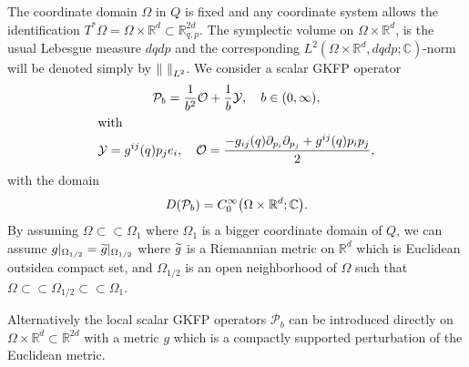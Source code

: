 \documentclass[10pt]{amsart}
\theoremstyle{definition}\newtheorem{defi}[theo]{Definition}\newtheorem{rema}[theo]{Remark}\newtheorem{exam}[theo]{Example}\newtheorem{exem}[theo]{Example}\newtheorem{nota}[theo]{Notation}
\newcommand{\C}{\mathbb{C}}
\newcommand{\R}{\mathbb{R}}
\newcommand{\clY}{\mathcal{Y}}
\newcommand{\clO}{\mathcal{O}}
\newcommand{\clP}{\mathcal{P}}
\newcommand\norm[1]{\left\lVert#1\right\rVert}
\let\oldtilde\tilde
\renewcommand*{\tilde}[1]{\mathchoice{\widetilde{#1}}{\widetilde{#1}}{\oldtilde{#1}}{\oldtilde{#1}}}
\let\originalleft\left
\let\originalright\right
\renewcommand{\left}{\mathopen{}\mathclose\bgroup\originalleft}
\renewcommand{\right}{\aftergroup\egroup\originalright}
\begin{document}
The coordinate domain $\Omega$ in $Q$ is fixed and any coordinate system allows the identification $T^*\Omega=\Omega\times\R^d\subset \R^{2d}_{q,p}$. The symplectic volume on $\Omega\times\R^d$, is the usual Lebesgue measure $dqdp$ and the corresponding $L^2(\Omega\times\R^d,dqdp;\C)$-norm will be denoted simply by $\norm{~}_{L^2}$. We consider a scalar GKFP operator
\begin{gather*}
\clP_b  = \frac{1}{b^2} \clO + \frac{1}{b} \clY, \quad b \in (0,\infty),
\\
\intertext{with} 
\clY =g^{ij}(q)p_j e_i,\quad \clO=\frac{-g_{ij}(q)\partial_{p_i}\partial_{p_j}+g^{ij}(q)p_ip_j}{2},
\end{gather*}
with the domain
\begin{align}
D(\clP_b) = C^\infty_0\left(\Omega\times\R^d; \C\right).
\end{align}
By assuming $\Omega\subset\subset\Omega_1$ where $\Omega_1$ is a bigger coordinate domain of $Q$, we can assume $g|_{\Omega_{1/2}}=\tilde{g}|_{\Omega_{1/2}}$ where $\tilde{g}$ is a Riemannian metric on $\R^d$ which is Euclidean outside\linebreak a compact set, and $\Omega_{1/2}$ is an open neighborhood of $\Omega$ such that $\Omega\subset\subset \Omega_{1/2}\subset\subset \Omega_1$.

Alternatively the local scalar GKFP operators $\clP_{b}$ can be introduced directly on $\Omega\times\R^d\subset \R^{2d}$ with a metric $g$ which is a compactly supported perturbation of the Euclidean metric.
\end{document}
